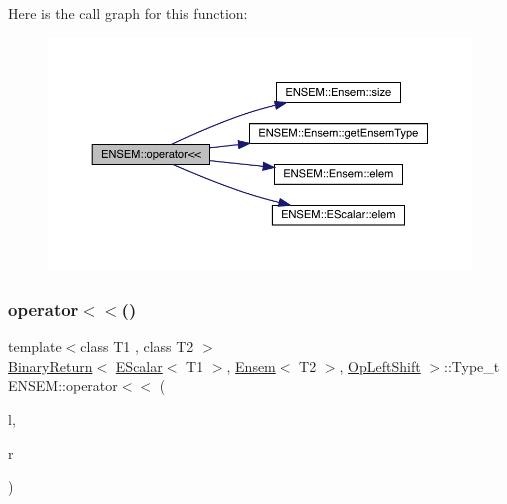 Here is the call graph for this function\+:\nopagebreak
\begin{figure}[H]
\begin{center}
\leavevmode
\includegraphics[width=350pt]{d1/d9e/group__eensem_ga6651d0e3a61fd80d621e17a1ae4496af_cgraph}
\end{center}
\end{figure}
\mbox{\label{group__eensem_ga8276aea8565989d936393895688a0a95}} 
\subsubsection{\texorpdfstring{operator$<$$<$()}{operator<<()}\hspace{0.1cm}{\footnotesize\ttfamily [4/4]}}
{\footnotesize\ttfamily template$<$class T1 , class T2 $>$ \\
\mbox{\hyperlink{structENSEM_1_1BinaryReturn}{Binary\+Return}}$<$ \mbox{\hyperlink{classENSEM_1_1EScalar}{E\+Scalar}}$<$ T1 $>$, \mbox{\hyperlink{classENSEM_1_1Ensem}{Ensem}}$<$ T2 $>$, \mbox{\hyperlink{structENSEM_1_1OpLeftShift}{Op\+Left\+Shift}} $>$\+::Type\+\_\+t E\+N\+S\+E\+M\+::operator$<$$<$ (\begin{DoxyParamCaption}\item[{const \mbox{\hyperlink{classENSEM_1_1EScalar}{E\+Scalar}}$<$ T1 $>$ \&}]{l,  }\item[{const \mbox{\hyperlink{classENSEM_1_1Ensem}{Ensem}}$<$ T2 $>$ \&}]{r }\end{DoxyParamCaption})\hspace{0.3cm}{\ttfamily [inline]}}

